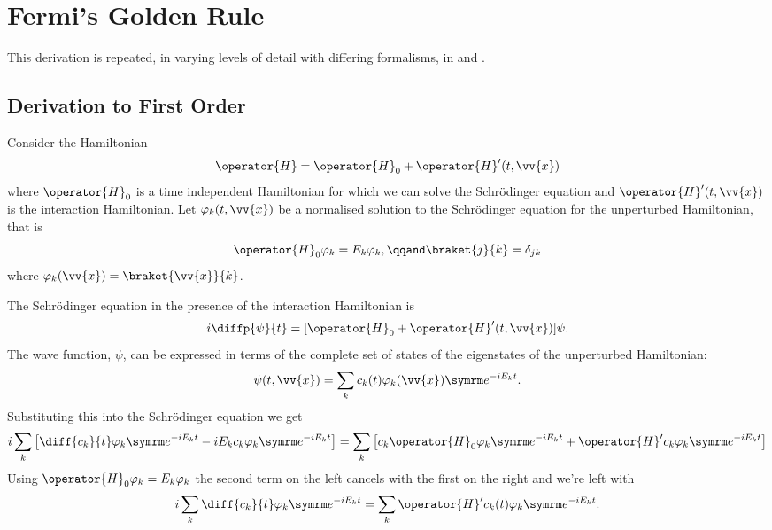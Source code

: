 \chapter{Fermi's Golden Rule}
\label{app:fermi's golden rule}
\begin{rmk}
    This derivation is repeated, in varying levels of detail with differing formalisms, in  and .
\end{rmk}
\section{Derivation to First Order}
Consider the Hamiltonian
\begin{equation}
    \operator{H} = \operator{H}_0 + \operator{H}'(t, \vv{x})
\end{equation}
where \(\operator{H}_0\) is a time independent Hamiltonian for which we can solve the Schrödinger equation and \(\operator{H}'(t, \vv{x})\) is the interaction Hamiltonian.
Let \(\varphi_k(t, \vv{x})\) be a normalised solution to the Schrödinger equation for the unperturbed Hamiltonian, that is
\begin{equation}
    \operator{H}_0\varphi_k = E_k\varphi_k, \qqand \braket{j}{k} = \delta_{jk}
\end{equation}
where \(\varphi_k(\vv{x}) = \braket{\vv{x}}{k}\).

The Schrödinger equation in the presence of the interaction Hamiltonian is
\begin{equation}
    i\diffp{\psi}{t} = [\operator{H}_0 + \operator{H}'(t, \vv{x})]\psi.
\end{equation}
The wave function, \(\psi\), can be expressed in terms of the complete set of states of the eigenstates of the unperturbed Hamiltonian:
\begin{equation}
    \psi(t, \vv{x}) = \sum_k c_k(t) \varphi_k(\vv{x}) \e^{-iE_kt}.
\end{equation}
Substituting this into the Schrödinger equation we get
\begin{equation}
    i \sum_k \left[ \diff{c_k}{t} \varphi_k \e^{-iE_kt} - iE_kc_k\varphi_k\e^{-iE_kt} \right] = \sum_k \left[ c_k\operator{H}_0\varphi_k \e^{-iE_kt} + \operator{H}'c_k\varphi_k\e^{-iE_kt} \right]
\end{equation}
Using \(\operator{H}_0\varphi_k = E_k\varphi_k\) the second term on the left cancels with the first on the right and we're left with
\begin{equation}\label{eqn:fermi's golden rule DE for cf}
    i \sum_k \diff{c_k}{t} \varphi_k\e^{-iE_kt} = \sum_k \operator{H}'c_k(t) \varphi_k \e^{-iE_kt}.
\end{equation}

